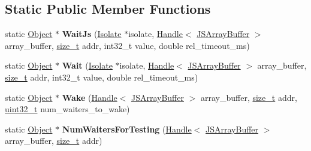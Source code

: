 \subsection*{Static Public Member Functions}
\begin{DoxyCompactItemize}
\item 
\mbox{\label{classv8_1_1internal_1_1FutexEmulation_a6d61be5e753e50ee663275ccb345204c}} 
static \mbox{\hyperlink{classv8_1_1internal_1_1Object}{Object}} $\ast$ {\bfseries Wait\+Js} (\mbox{\hyperlink{classv8_1_1internal_1_1Isolate}{Isolate}} $\ast$isolate, \mbox{\hyperlink{classv8_1_1internal_1_1Handle}{Handle}}$<$ \mbox{\hyperlink{classv8_1_1internal_1_1JSArrayBuffer}{J\+S\+Array\+Buffer}} $>$ array\+\_\+buffer, \mbox{\hyperlink{classsize__t}{size\+\_\+t}} addr, int32\+\_\+t value, double rel\+\_\+timeout\+\_\+ms)
\item 
\mbox{\label{classv8_1_1internal_1_1FutexEmulation_ac465f50c7ed498ef70cb87c233af910f}} 
static \mbox{\hyperlink{classv8_1_1internal_1_1Object}{Object}} $\ast$ {\bfseries Wait} (\mbox{\hyperlink{classv8_1_1internal_1_1Isolate}{Isolate}} $\ast$isolate, \mbox{\hyperlink{classv8_1_1internal_1_1Handle}{Handle}}$<$ \mbox{\hyperlink{classv8_1_1internal_1_1JSArrayBuffer}{J\+S\+Array\+Buffer}} $>$ array\+\_\+buffer, \mbox{\hyperlink{classsize__t}{size\+\_\+t}} addr, int32\+\_\+t value, double rel\+\_\+timeout\+\_\+ms)
\item 
\mbox{\label{classv8_1_1internal_1_1FutexEmulation_adfe362cc5f3dd60406b90eb020fbd965}} 
static \mbox{\hyperlink{classv8_1_1internal_1_1Object}{Object}} $\ast$ {\bfseries Wake} (\mbox{\hyperlink{classv8_1_1internal_1_1Handle}{Handle}}$<$ \mbox{\hyperlink{classv8_1_1internal_1_1JSArrayBuffer}{J\+S\+Array\+Buffer}} $>$ array\+\_\+buffer, \mbox{\hyperlink{classsize__t}{size\+\_\+t}} addr, \mbox{\hyperlink{classuint32__t}{uint32\+\_\+t}} num\+\_\+waiters\+\_\+to\+\_\+wake)
\item 
\mbox{\label{classv8_1_1internal_1_1FutexEmulation_ad4ce86d6563fa7de7dd400bbd89f62d8}} 
static \mbox{\hyperlink{classv8_1_1internal_1_1Object}{Object}} $\ast$ {\bfseries Num\+Waiters\+For\+Testing} (\mbox{\hyperlink{classv8_1_1internal_1_1Handle}{Handle}}$<$ \mbox{\hyperlink{classv8_1_1internal_1_1JSArrayBuffer}{J\+S\+Array\+Buffer}} $>$ array\+\_\+buffer, \mbox{\hyperlink{classsize__t}{size\+\_\+t}} addr)
\end{DoxyCompactItemize}
